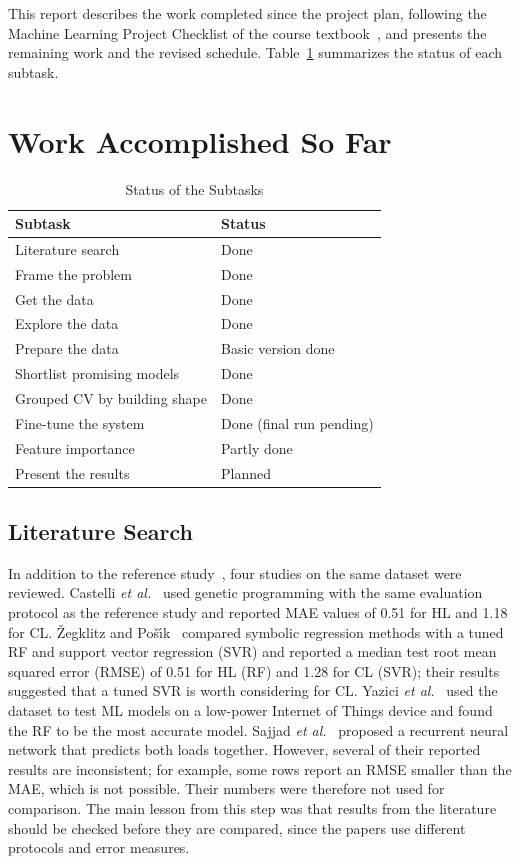 \documentclass[journal]{IEEEtran}
\begin{document}
This report describes the work completed since the project plan, following the Machine Learning Project
Checklist of the course textbook~\cite{geron2022}, and presents the remaining work and the revised
schedule. Table~\ref{tab:status} summarizes the status of each subtask.

\section{Work Accomplished So Far}

\begin{table}[!h]
\caption{Status of the Subtasks}
\label{tab:status}
\centering
\begin{tabularx}{\columnwidth}{@{}Xl@{}}
\toprule
Subtask & Status \\
\midrule
Literature search               & Done \\
Frame the problem               & Done \\
Get the data                    & Done \\
Explore the data                & Done \\
Prepare the data                & Basic version done \\
Shortlist promising models      & Done \\
Grouped CV by building shape    & Done \\
Fine-tune the system            & Done (final run pending) \\
Feature importance              & Partly done \\
Present the results             & Planned \\
\bottomrule
\end{tabularx}
\end{table}

\subsection{Literature Search}
In addition to the reference study~\cite{tsanas2012}, four studies on the same dataset were reviewed.
Castelli \emph{et al.}~\cite{castelli2015} used genetic programming with the same evaluation protocol as
the reference study and reported MAE values of 0.51 for HL and 1.18 for CL. \v{Z}egklitz and
Po\v{s}\'{\i}k~\cite{zegklitz2017} compared symbolic regression methods with a tuned RF and support vector
regression (SVR) and reported a median test root mean squared error (RMSE) of 0.51 for HL (RF) and 1.28
for CL (SVR); their results suggested that a tuned SVR is worth considering for CL. Yazici
\emph{et al.}~\cite{yazici2018} used the dataset to test ML models on a low-power Internet of Things
device and found the RF to be the most accurate model. Sajjad \emph{et al.}~\cite{sajjad2020} proposed a
recurrent neural network that predicts both loads together. However, several of their reported results
are inconsistent; for example, some rows report an RMSE smaller than the MAE, which is not possible.
Their numbers were therefore not used for comparison. The main lesson from this step was that results
from the literature should be checked before they are compared, since the papers use different
protocols and error measures.
\end{document}
